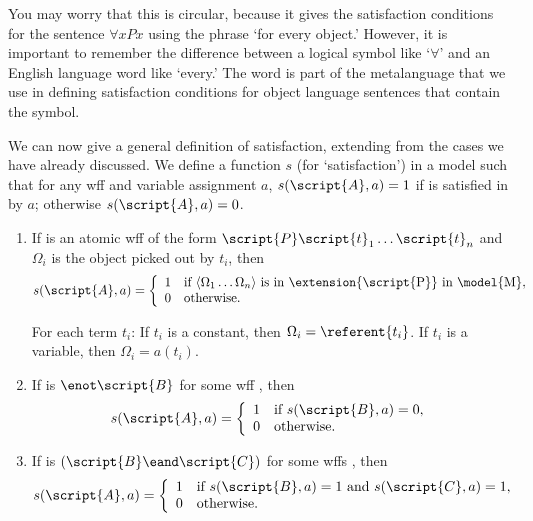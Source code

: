 You may worry that this is circular, because it gives the satisfaction conditions for the sentence $\forall x Px$ using the phrase `for every object.' However, it is important to remember the difference between a logical symbol like `$\forall$' and an English language word like `every.' The word is part of the metalanguage that we use in defining satisfaction conditions for object language sentences that contain the symbol.

We can now give a general definition of satisfaction, extending from the cases we have already discussed. We define a function $s$ (for `satisfaction') in a model  such that for any wff  and variable assignment $a$, $s(\script{A}, a)=1$ if  is satisfied in  by $a$; otherwise $s(\script{A}, a)=0$.

\begin{enumerate}
\item If  is an atomic wff of the form $\script{P}\script{t}_1\ldots\script{t}_n$ and $\Omega_i$ is the object picked out by $t_i$, then
\begin{displaymath}s(\script{A}, a) =
	\left\{\begin{array}{ll}
	1 & \mbox{if ${\langle}\Omega_1\ldots\Omega_n{\rangle}$ is in \extension{\script{P}} in \model{M}},\\
	0 & \mbox{otherwise.}
	\end{array}\right.
\end{displaymath}

For each term $t_i$: If $t_i$ is a constant, then $\Omega_i = \referent{t_i}$. If $t_i$ is a variable, then $\Omega_i = a(t_i)$.

\item If  is ${\enot}\script{B}$ for some wff , then
\begin{displaymath}s(\script{A}, a) =
	\left\{\begin{array}{ll}
	1 & \mbox{if $s(\script{B}, a) = 0$},\\
	0 & \mbox{otherwise.}
	\end{array}\right.
\end{displaymath}


\item If  is $(\script{B}\eand\script{C})$ for some wffs , then
\begin{displaymath}s(\script{A}, a) =
	\left\{\begin{array}{ll}
	1 & \mbox{if $s(\script{B}, a) = 1$ and $s(\script{C}, a) = 1$,}\\
	0 & \mbox{otherwise.}
	\end{array}\right.
\end{displaymath}


\end{enumerate}
